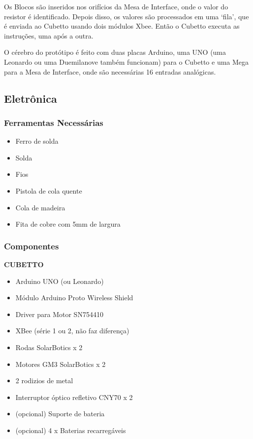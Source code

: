 \documentclass[paper=a4, fontsize=11pt]{scrartcl} %
\numberwithin{equation}{section} %
\numberwithin{figure}{section} %
\numberwithin{table}{section} %
\begin{document}
Os Blocos são inseridos nos orifícios da Mesa de Interface, onde o valor do resistor é identificado. Depois disso, os valores são processados em uma ‘fila’, que é enviada ao Cubetto usando dois módulos Xbee. Então o Cubetto executa as instruções, uma após a outra.

O cérebro do protótipo é feito com duas placas Arduino, uma UNO (uma Leonardo ou uma Duemilanove também funcionam) para o Cubetto e uma Mega para a Mesa de Interface, onde são necessárias 16 entradas analógicas.

\subsection{Eletrônica}
\subsubsection*{Ferramentas Necessárias}

\begin{itemize}
\item Ferro de solda
\item Solda
\item Fios
\item Pistola de cola quente
\item Cola de madeira
\item Fita de cobre com 5mm de largura

\end{itemize}

\subsubsection*{Componentes}

\textbf{CUBETTO}
\begin{itemize}
\item Arduino UNO (ou Leonardo) 
\item Módulo Arduino Proto Wireless Shield 
\item Driver para Motor SN754410 
\item XBee (série 1 ou 2, não faz diferença) 
\item Rodas SolarBotics  x 2 
\item Motores GM3 SolarBotics x 2 
\item 2 rodizios de metal 
\item Interruptor óptico refletivo CNY70 x 2 
\item (opcional) Suporte de bateria 
\item (opcional) 4 x Baterias recarregáveis
\end{itemize}
 
\end{document}
